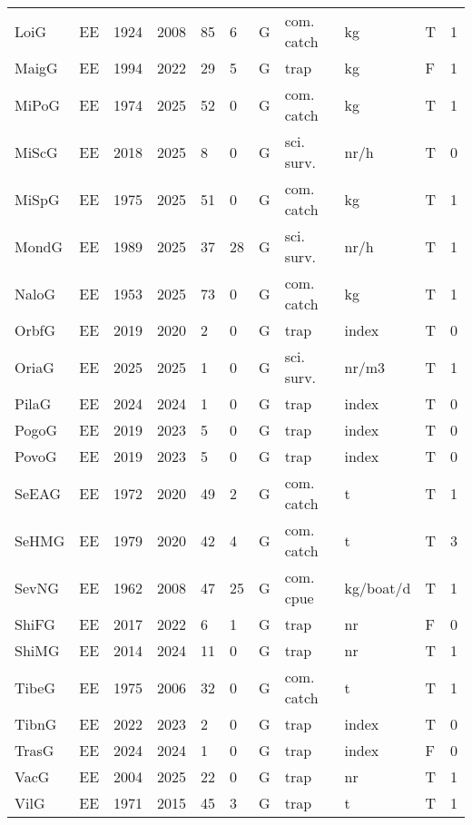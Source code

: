 \begin{table}[ht]
\begin{tabular}{p{1cm}p{1cm}p{1cm}p{1cm}p{0.8cm}p{0.8cm}p{1cm}p{2cm}p{2cm}p{1cm}p{1cm}}
  LoiG & EE & 1924 & 2008 & 85 & 6 & G & com. catch & kg & T & 1 \\ 
  MaigG & EE & 1994 & 2022 & 29 & 5 & G & trap & kg & F & 1 \\ 
  MiPoG & EE & 1974 & 2025 & 52 & 0 & G & com. catch & kg & T & 1 \\ 
  MiScG & EE & 2018 & 2025 & 8 & 0 & G & sci. surv. & nr/h & T & 0 \\ 
  MiSpG & EE & 1975 & 2025 & 51 & 0 & G & com. catch & kg & T & 1 \\ 
  MondG & EE & 1989 & 2025 & 37 & 28 & G & sci. surv. & nr/h & T & 1 \\ 
  NaloG & EE & 1953 & 2025 & 73 & 0 & G & com. catch & kg & T & 1 \\ 
  OrbfG & EE & 2019 & 2020 & 2 & 0 & G & trap & index & T & 0 \\ 
  OriaG & EE & 2025 & 2025 & 1 & 0 & G & sci. surv. & nr/m3 & T & 1 \\ 
  PilaG & EE & 2024 & 2024 & 1 & 0 & G & trap & index & T & 0 \\ 
  PogoG & EE & 2019 & 2023 & 5 & 0 & G & trap & index & T & 0 \\ 
  PovoG & EE & 2019 & 2023 & 5 & 0 & G & trap & index & T & 0 \\ 
  SeEAG & EE & 1972 & 2020 & 49 & 2 & G & com. catch & t & T & 1 \\ 
  SeHMG & EE & 1979 & 2020 & 42 & 4 & G & com. catch & t & T & 3 \\ 
  SevNG & EE & 1962 & 2008 & 47 & 25 & G & com. cpue & kg/boat/d & T & 1 \\ 
  ShiFG & EE & 2017 & 2022 & 6 & 1 & G & trap & nr & F & 0 \\ 
  ShiMG & EE & 2014 & 2024 & 11 & 0 & G & trap & nr & T & 1 \\ 
  TibeG & EE & 1975 & 2006 & 32 & 0 & G & com. catch & t & T & 1 \\ 
  TibnG & EE & 2022 & 2023 & 2 & 0 & G & trap & index & T & 0 \\ 
  TrasG & EE & 2024 & 2024 & 1 & 0 & G & trap & index & F & 0 \\ 
  VacG & EE & 2004 & 2025 & 22 & 0 & G & trap & nr & T & 1 \\ 
  VilG & EE & 1971 & 2015 & 45 & 3 & G & trap & t & T & 1 \\ 
   \hline
\end{tabular}
\end{table}
